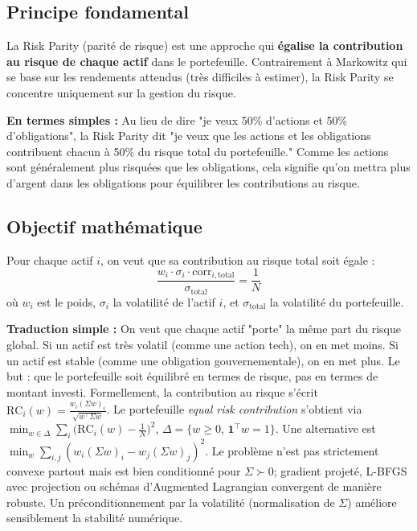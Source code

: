 \documentclass[11pt,a4paper]{article}
\begin{document}
\subsection{Principe fondamental}
La Risk Parity (parité de risque) est une approche qui \textbf{égalise la contribution au risque de chaque actif} dans le portefeuille. Contrairement à Markowitz qui se base sur les rendements attendus (très difficiles à estimer), la Risk Parity se concentre uniquement sur la gestion du risque.

\textbf{En termes simples :} Au lieu de dire "je veux 50\% d'actions et 50\% d'obligations", la Risk Parity dit "je veux que les actions et les obligations contribuent chacun à 50\% du risque total du portefeuille." Comme les actions sont généralement plus risquées que les obligations, cela signifie qu'on mettra plus d'argent dans les obligations pour équilibrer les contributions au risque.

\subsection{Objectif mathématique}
Pour chaque actif \(i\), on veut que sa contribution au risque total soit égale :
\[\frac{w_i \cdot \sigma_i \cdot \text{corr}_{i,\text{total}}}{\sigma_{\text{total}}} = \frac{1}{N}\]
où \(w_i\) est le poids, \(\sigma_i\) la volatilité de l'actif \(i\), et \(\sigma_{\text{total}}\) la volatilité du portefeuille.

\textbf{Traduction simple :} On veut que chaque actif "porte" la même part du risque global. Si un actif est très volatil (comme une action tech), on en met moins. Si un actif est stable (comme une obligation gouvernementale), on en met plus. Le but : que le portefeuille soit équilibré en termes de risque, pas en termes de montant investi.
\noindent Formellement, la contribution au risque s'écrit \(\text{RC}_i(w)=\frac{w_i (\Sigma w)_i}{\sqrt{w^\top \Sigma w}}\). Le portefeuille \emph{equal risk contribution} s'obtient via \(\min_{w\in\Delta}\sum_i\big(\text{RC}_i(w)-\frac{1}{N}\big)^2\), \(\Delta=\{w\ge 0,\, \mathbf{1}^\top w=1\}\). Une alternative est \(\min_w \sum_{i,j} (w_i (\Sigma w)_i - w_j (\Sigma w)_j)^2\). Le problème n'est pas strictement convexe partout mais est bien conditionné pour \(\Sigma\succ 0\); gradient projeté, L-BFGS avec projection ou schémas d'Augmented Lagrangian convergent de manière robuste. Un préconditionnement par la volatilité (normalisation de \(\Sigma\)) améliore sensiblement la stabilité numérique.
\end{document}

